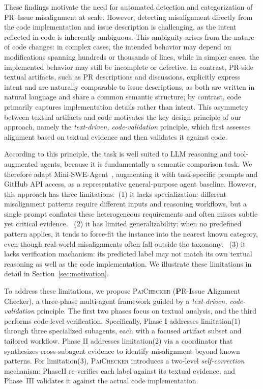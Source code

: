 \documentclass[sigconf, review, anonymous]{acmart}
\newcommand{\tool}{\textsc{PaiChecker}\xspace}
\begin{document}
These findings motivate the need for automated detection and categorization of PR–Issue misalignment at scale. However, detecting misalignment directly from the code implementation and issue description is challenging, as the intent reflected in code is inherently ambiguous. This ambiguity arises from the nature of code changes: in complex cases, the intended behavior may depend on modifications spanning hundreds or thousands of lines, while in simpler cases, the implemented behavior may still be incomplete or defective. 
In contrast, PR-side textual artifacts, such as PR descriptions and discussions, explicitly express intent and are naturally comparable to issue descriptions, as both are written in natural language and share a common semantic structure; by contrast, code primarily captures implementation details rather than intent. This asymmetry between textual artifacts and code motivates the key design principle of our approach, namely the \textit{text-driven, code-validation} principle, which first assesses alignment based on textual evidence and then validates it against code.
 
According to this principle, the task is well suited to LLM reasoning and tool-augmented agents, because it is fundamentally a semantic comparison task. We therefore adapt Mini-SWE-Agent~\cite{minisweagent}, augmenting it with task-specific prompts and GitHub API access, as a representative general-purpose agent baseline. However, this approach has three limitations:~(1) it lacks specialization: different misalignment patterns require different inputs and reasoning workflows, but a single prompt conflates these heterogeneous requirements and often misses subtle yet critical evidence. ~(2) it has limited generalizability: when no predefined pattern applies, it tends to force-fit the instance into the nearest known category, even though real-world misalignments often fall outside the taxonomy. ~(3) it lacks verification machanism: its predicted label may not match its own textual reasoning as well as the code implementation. We illustrate these limitations in detail in Section~\ref{sec:motivation}.

To address these limitations, we propose \tool
(\textbf{P}R-\textbf{I}ssue \textbf{A}lignment Checker), a
three-phase multi-agent framework guided by a
\textit{text-driven, code-validation} principle. The first two
phases focus on textual analysis, and the third performs
code-level verification. Specifically, Phase I addresses
limitation(1) through three specialized subagents, each with a
focused artifact subset and tailored workflow. Phase II addresses limitation(2) via a coordinator that synthesizes cross‑subagent evidence to identify misalignment beyond known patterns. For limitation(3), \tool introduces a two-level
\textit{self-correction} mechanism: PhaseII re-verifies each
label against its textual evidence, and Phase~III validates it
against the actual code implementation.                                               
\end{document}
